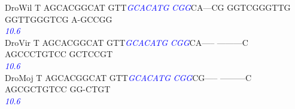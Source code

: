 \documentclass[11pt,twoside,reqno,a4paper]{article}
\begin{document}
{DroWil	T	AGCACGGCAT	GTT\textit{\textcolor{Blue}{G}}\textit{\textcolor{Blue}{C}}\textit{\textcolor{Blue}{A}}\textit{\textcolor{Blue}{C}}\textit{\textcolor{Blue}{A}}\textit{\textcolor{Blue}{T}}\textit{\textcolor{Blue}{G}}	\textit{\textcolor{Blue}{C}}\textit{\textcolor{Blue}{G}}\textit{\textcolor{Blue}{G}}CA---CG	GGTCGGGTTG	GGTTGGGTCG	A-GCCGG\\
\hspace*{7\charwidth}\hspace*{1\charwidth}\hspace*{1\charwidth}\hspace*{14\charwidth}\textit{\textcolor{Blue}{10.6}}\hspace*{1\charwidth}\hspace*{1\charwidth}\hspace*{1\charwidth}\hspace*{1\charwidth}\\
DroVir	T	AGCACGGCAT	GTT\textit{\textcolor{Blue}{G}}\textit{\textcolor{Blue}{C}}\textit{\textcolor{Blue}{A}}\textit{\textcolor{Blue}{C}}\textit{\textcolor{Blue}{A}}\textit{\textcolor{Blue}{T}}\textit{\textcolor{Blue}{G}}	\textit{\textcolor{Blue}{C}}\textit{\textcolor{Blue}{G}}\textit{\textcolor{Blue}{G}}CA-----	---------C	AGCCCTGTCC	GCTCCGT\\
\hspace*{7\charwidth}\hspace*{1\charwidth}\hspace*{1\charwidth}\hspace*{14\charwidth}\textit{\textcolor{Blue}{10.6}}\hspace*{1\charwidth}\hspace*{1\charwidth}\hspace*{1\charwidth}\hspace*{1\charwidth}\\
DroMoj	T	AGCACGGCAT	GTT\textit{\textcolor{Blue}{G}}\textit{\textcolor{Blue}{C}}\textit{\textcolor{Blue}{A}}\textit{\textcolor{Blue}{C}}\textit{\textcolor{Blue}{A}}\textit{\textcolor{Blue}{T}}\textit{\textcolor{Blue}{G}}	\textit{\textcolor{Blue}{C}}\textit{\textcolor{Blue}{G}}\textit{\textcolor{Blue}{G}}CG-----	---------C	AGCGCTGTCC	GG-CTGT\\
\hspace*{7\charwidth}\hspace*{1\charwidth}\hspace*{1\charwidth}\hspace*{14\charwidth}\textit{\textcolor{Blue}{10.6}}\hspace*{1\charwidth}\hspace*{1\charwidth}\hspace*{1\charwidth}\hspace*{1\charwidth}\\
}
\end{document}
